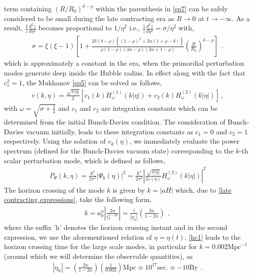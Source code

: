 \documentclass{article}
\begin{document}
term containing $\left(R/R_0\right)^{\delta-\rho}$ within the parenthesis in \ref{sp7} can be safely 
considered to be small during the late contracting era as $R \rightarrow 0$ at $t \rightarrow -\infty$. 
As a result, $\frac{1}{z}\frac{d^2z}{d\eta^2}$ becomes proportional to $1/\eta^2$ i.e., $\frac{1}{z}\frac{d^2z}{d\eta^2} = \sigma/\eta^2$ with,
\begin{align}
\sigma = \xi(\xi-1)\left[1 + \frac{2\delta(\delta-\rho)\left\{(1-\rho)^2 + 2n(1+\rho-\delta)\right\}}
{\rho(1-\rho)(4n-\rho)(2n+1-\rho)}\left(\frac{R}{R_0}\right)^{\delta-\rho}\right]~~.
\label{spnew}
\end{align}
which is approximately a constant in the era, when the primordial perturbation modes generate deep inside the Hubble radius. In 
effect along with the fact that $c_s^2 = 1$, the Mukhanov \ref{sp5} can be solved as follows,
\begin{align}
v(k,\eta) = \frac{\sqrt{\pi|\eta|}}{2} \left[c_1(k)H_{\omega}^{(1)}(k|\eta|) +
c_2(k)H_{\omega}^{(2)}(k|\eta|)\right]\, ,
\label{sp8}
\end{align}
with $\omega = \sqrt{\sigma + \frac{1}{4}}$ and $c_1$ and $c_2$ are integration constants which can be determined from the initial 
Bunch-Davies condition. The consideration of Bunch-Davies vacuum initially, leads to these integration constants as $c_1 = 0$ and $c_2 =1$ 
respectively. Using the solution of $v_k(\eta)$, we immediately evaluate the power spectrum (defined for the Bunch-Davies vacuum state) 
corresponding to the $k$-th scalar perturbation mode, which is defined as follows,
\begin{align}
P_{\Psi}(k,\eta) = \frac{k^3}{2\pi^2}\left|\Psi_k(\eta)\right|^2
= \frac{k^3}{2\pi^2}\left|\frac{\sqrt{\pi|\eta|}}{2z(\eta)}H_{\omega}^{(2)}(k|\eta|)\right|^2
\label{sp9}
\end{align}
The horizon crossing of the mode $k$ is given by $k = \left|aH\right|$ which, due to \ref{late contracting expressions}, take the following form,
\begin{eqnarray}
 k = a_0^n\left|\frac{2n}{t_h^{1-2n}}\right| = \frac{1}{|\eta_h|}\left(\frac{2n}{1-2n}\right)~~,
 \label{hc1}
\end{eqnarray}
where the suffix 'h' denotes the horizon crossing instant and in the second expression, we use the aforementioned relation of $\eta = \eta(t)$. 
\ref{hc1} leads to the horizon crossing time for the large scale modes, in particular for $k = 0.002\mathrm{Mpc}^{-1}$ (around which we will determine 
the observable quantities), as 
\begin{eqnarray}
 \left|\eta_h\right| = \left(\frac{2n}{1-2n}\right)\left(\frac{1}{0.002}\right)\mathrm{Mpc} \approx 10^{17}\mathrm{sec.} \approx -10\mathrm{By}~~.
 \label{hc2}
\end{eqnarray}
\end{document}

